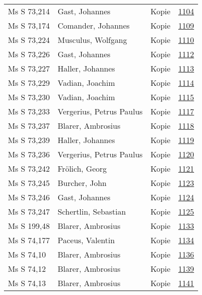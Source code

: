 \documentclass[10pt,a4paper,landscape]{report}
\begin{document}
\begin{longtable}{p{16cm}p{4cm}lr}
Ms S 73,214	&	Gast, Johannes	&	Kopie	&	\href{http://130.60.24.72/assignment/1104}{1104}\\
Ms S 73,174	&	Comander, Johannes	&	Kopie	&	\href{http://130.60.24.72/assignment/1109}{1109}\\
Ms S 73,224	&	Musculus, Wolfgang	&	Kopie	&	\href{http://130.60.24.72/assignment/1110}{1110}\\
Ms S 73,226	&	Gast, Johannes	&	Kopie	&	\href{http://130.60.24.72/assignment/1112}{1112}\\
Ms S 73,227	&	Haller, Johannes	&	Kopie	&	\href{http://130.60.24.72/assignment/1113}{1113}\\
Ms S 73,229	&	Vadian, Joachim	&	Kopie	&	\href{http://130.60.24.72/assignment/1114}{1114}\\
Ms S 73,230	&	Vadian, Joachim	&	Kopie	&	\href{http://130.60.24.72/assignment/1115}{1115}\\
Ms S 73,233	&	Vergerius, Petrus Paulus	&	Kopie	&	\href{http://130.60.24.72/assignment/1117}{1117}\\
Ms S 73,237	&	Blarer, Ambrosius	&	Kopie	&	\href{http://130.60.24.72/assignment/1118}{1118}\\
Ms S 73,239	&	Haller, Johannes	&	Kopie	&	\href{http://130.60.24.72/assignment/1119}{1119}\\
Ms S 73,236	&	Vergerius, Petrus Paulus	&	Kopie	&	\href{http://130.60.24.72/assignment/1120}{1120}\\
Ms S 73,242	&	Frölich, Georg	&	Kopie	&	\href{http://130.60.24.72/assignment/1121}{1121}\\
Ms S 73,245	&	Burcher, John	&	Kopie	&	\href{http://130.60.24.72/assignment/1123}{1123}\\
Ms S 73,246	&	Gast, Johannes	&	Kopie	&	\href{http://130.60.24.72/assignment/1124}{1124}\\
Ms S 73,247	&	Schertlin, Sebastian	&	Kopie	&	\href{http://130.60.24.72/assignment/1125}{1125}\\
Ms S 199,48	&	Blarer, Ambrosius	&	Kopie	&	\href{http://130.60.24.72/assignment/1133}{1133}\\
Ms S 74,177	&	Paceus, Valentin	&	Kopie	&	\href{http://130.60.24.72/assignment/1134}{1134}\\
Ms S 74,10	&	Blarer, Ambrosius	&	Kopie	&	\href{http://130.60.24.72/assignment/1136}{1136}\\
Ms S 74,12	&	Blarer, Ambrosius	&	Kopie	&	\href{http://130.60.24.72/assignment/1139}{1139}\\
Ms S 74,13	&	Blarer, Ambrosius	&	Kopie	&	\href{http://130.60.24.72/assignment/1141}{1141}\\

\end{longtable}
\end{document}
